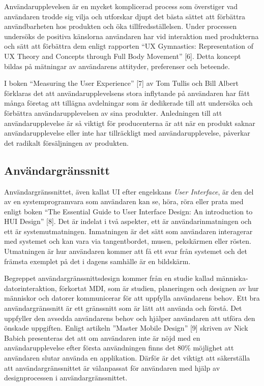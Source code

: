 \documentclass[12pt]{kththesis}
\begin{document}
Användarupplevelsen är en mycket komplicerad process som överstiger vad användaren trodde sig vilja och utforskar djupt det bästa sättet att förbättra användbarheten hos produkten och öka tillfredsställelsen. Under processen undersöks de positiva känslorna användaren har vid interaktion med produkterna och sätt att förbättra dem enligt rapporten “UX Gymnastics: Representation of UX Theory and Concepts through Full Body Movement” [6]. Detta koncept bildas på mätningar av användarens attityder, preferenser och beteende. 

I boken “Measuring the User Experience” [7] av Tom Tullis och Bill Albert förklaras det att användarupplevelsens stora inflytande på användaren har fått många företag att tillägna avdelningar som är dedikerade till att undersöka och förbättra användarupplevelsen av sina produkter. Anledningen till att användarupplevelse är så viktigt för producenterna är att när en produkt saknar användarupplevelse eller inte har tillräckligt med användarupplevelse, påverkar det radikalt försäljningen av produkten. 

\subsection{Användargränssnitt}
Användargränssnittet, även kallat UI efter engelskans \textit{User Interface}, är den del av en systemprogramvara som användaren kan se, höra, röra eller prata med enligt boken “The Essential Guide to User Interface Design: An introduction to HUI Design” [8]. Det är indelat i två aspekter, ett är användarinmatningen och ett är systemutmatningen. Inmatningen är det sätt som användaren interagerar med systemet och kan vara via tangentbordet, musen, pekskärmen eller rösten. Utmatningen är hur användaren kommer att få ett svar från systemet och det främsta exemplet på det i dagens samhälle är en bildskärm. 

Begreppet användargränssnittsdesign kommer från en studie kallad människa-datorinteraktion, förkortat MDI, som är studien, planeringen och designen av hur människor och datorer kommunicerar för att uppfylla användarens behov. Ett bra användargränssnitt är ett gränssnitt som är lätt att använda och förstå. Det uppfyller den avsedda användarens behov och hjälper användaren att utföra den önskade uppgiften. Enligt artikeln ”Master Mobile Design” [9] skriven av Nick Babich presenteras det att om användaren inte är nöjd med en användarupplevelse efter första användningen finns det 80\% möjlighet att användaren slutar använda en applikation. Därför är det viktigt att säkerställa att användargränssnittet är välanpassat för användaren med hjälp av designprocessen i användargränssnittet.
\end{document}
